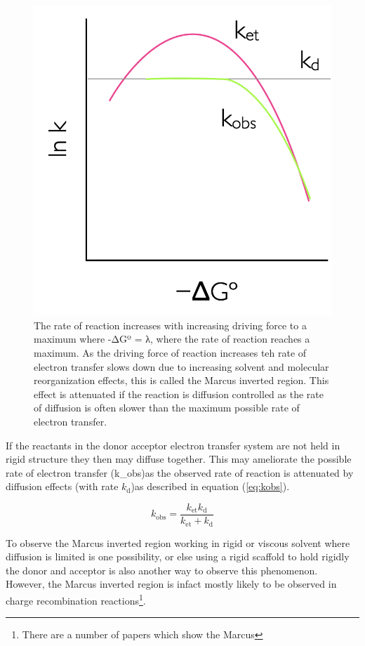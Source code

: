 \documentclass[
]{book}
\begin{document}
\begin{figure}

{\centering \includegraphics[width=0.5\linewidth]{images/marcusinverted} 

}

\caption{The rate of reaction increases with increasing driving force to a maximum where -ΔGº = λ, where the rate of reaction reaches a maximum. As the driving force of reaction increases teh rate of electron transfer slows down due to increasing solvent and molecular reorganization effects, this is called the Marcus inverted region. This effect is attenuated if the reaction is diffusion controlled as the rate of diffusion is often slower than the maximum possible rate of electron transfer.}\label{fig:marcusinverted}
\end{figure}

If the reactants in the donor acceptor electron transfer system are not held in rigid structure they then may diffuse together. This may ameliorate the possible rate of electron transfer (k\_\textrm{obs})as the observed rate of reaction is attenuated by diffusion effects (with rate \(k_\textrm{d}\))as described in equation (\eqref{eq:kobs}).

\begin{equation}
k_\textrm{obs}= \frac{k_\textrm{et}k_\textrm{d}}{k_\textrm{et}+k_\textrm{d}}
\label{eq:kobs}
\end{equation}

To observe the Marcus inverted region working in rigid or viscous solvent where diffusion is limited is one possibility, or else using a rigid scaffold to hold rigidly the donor and acceptor is also another way to observe this phenomenon. However, the Marcus inverted region is infact mostly likely to be observed in charge recombination reactions\footnote{There are a number of papers which show the Marcus}.
\end{document}
